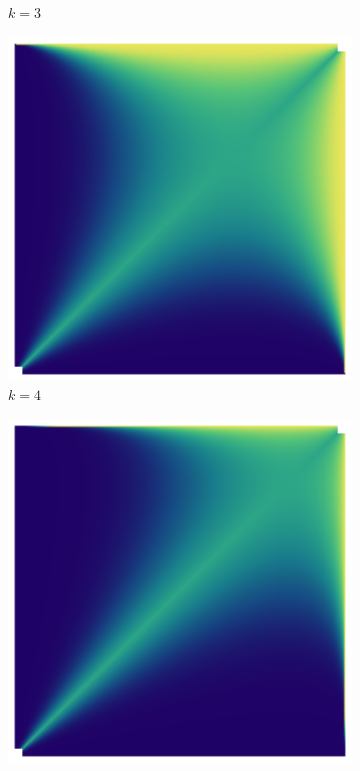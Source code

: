 \documentclass{article}
\theoremstyle{definition}
\begin{document}
\begin{figure}[H]
\begin{subfigure}[b]{0.130\textwidth}
        \caption{$k=3$}
        \label{fig:ppkBG_6_3}
    \end{subfigure}
    \hspace{0.00\textwidth} %
        \begin{subfigure}[b]{0.130\textwidth}
        \includegraphics[width=\textwidth]{img/BinomialBayesian_ppk_6_4.png}
        \caption{$k=4$}
        \label{fig:ppkBG_6_4}
    \end{subfigure}
    \hspace{0.00\textwidth} %
        \begin{subfigure}[b]{0.130\textwidth}
        \includegraphics[width=\textwidth]{img/BinomialBayesian_ppk_6_5.png}

\end{subfigure}
\end{figure}
\end{document}
